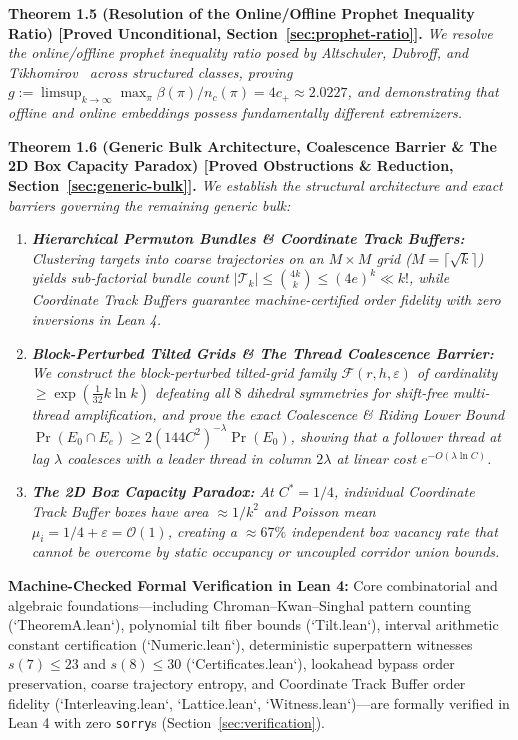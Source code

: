 \documentclass[
  11pt,
]{article}
\providecommand{\tightlist}{%
  \setlength{\itemsep}{0pt}\setlength{\parskip}{0pt}}
\begin{document}
\textbf{Theorem 1.5 (Resolution of the Online/Offline Prophet Inequality Ratio) [Proved Unconditional, Section~\ref{sec:prophet-ratio}].}
\emph{We resolve the online/offline prophet inequality ratio posed by Altschuler, Dubroff, and Tikhomirov~\cite{ref-ADT26} across structured classes, proving $g := \limsup_{k \to \infty} \max_\pi \beta(\pi)/n_c(\pi) = 4 c_+ \approx 2.0227$, and demonstrating that offline and online embeddings possess fundamentally different extremizers.}

\textbf{Theorem 1.6 (Generic Bulk Architecture, Coalescence Barrier \& The 2D Box Capacity Paradox) [Proved Obstructions \& Reduction, Section~\ref{sec:generic-bulk}].}
\emph{We establish the structural architecture and exact barriers governing the remaining generic bulk:}
\begin{enumerate}
\def\labelenumi{(\alph{enumi})}
\tightlist
\item \emph{\textbf{Hierarchical Permuton Bundles \& Coordinate Track Buffers:} Clustering targets into coarse trajectories on an $M \times M$ grid ($M = \lceil\sqrt{k}\rceil$) yields sub-factorial bundle count $|\mathcal{T}_k| \le \binom{4k}{k} \le (4e)^k \ll k!$, while Coordinate Track Buffers guarantee machine-certified order fidelity with zero inversions in Lean 4.}
\item \emph{\textbf{Block-Perturbed Tilted Grids \& The Thread Coalescence Barrier:} We construct the block-perturbed tilted-grid family $\mathcal{F}(r, h, \varepsilon)$ of cardinality $\ge \exp(\frac{1}{32}k\ln k)$ defeating all $8$ dihedral symmetries for shift-free multi-thread amplification, and prove the exact Coalescence \& Riding Lower Bound $\Pr(E_0 \cap E_e) \ge 2(144 C^2)^{-\lambda}\Pr(E_0)$, showing that a follower thread at lag $\lambda$ coalesces with a leader thread in column $2\lambda$ at linear cost $e^{-O(\lambda \ln C)}$.}
\item \emph{\textbf{The 2D Box Capacity Paradox:} At $C^* = 1/4$, individual Coordinate Track Buffer boxes have area $\approx 1/k^2$ and Poisson mean $\mu_i = 1/4 + \varepsilon = \mathcal{O}(1)$, creating a $\approx 67\%$ independent box vacancy rate that cannot be overcome by static occupancy or uncoupled corridor union bounds.}
\end{enumerate}

\textbf{Machine-Checked Formal Verification in Lean 4:} Core combinatorial and algebraic foundations—including Chroman--Kwan--Singhal pattern counting (`TheoremA.lean`), polynomial tilt fiber bounds (`Tilt.lean`), interval arithmetic constant certification (`Numeric.lean`), deterministic superpattern witnesses $s(7) \le 23$ and $s(8) \le 30$ (`Certificates.lean`), lookahead bypass order preservation, coarse trajectory entropy, and Coordinate Track Buffer order fidelity (`Interleaving.lean`, `Lattice.lean`, `Witness.lean`)—are formally verified in Lean 4 with zero \texttt{sorry}s (Section~\ref{sec:verification}).
\end{document}
